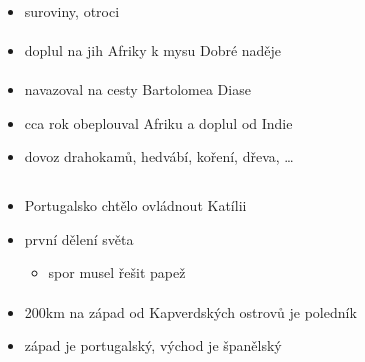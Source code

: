\paragraph{}
\begin{itemize}
\item suroviny, otroci
\end{itemize}

\paragraph{}
\begin{itemize}
\item doplul na jih Afriky k mysu Dobré naděje
\end{itemize}

\paragraph{}
\begin{itemize}
\item navazoval na cesty Bartolomea Diase
\item cca rok obeplouval Afriku a doplul od Indie
\item[\ra] dovoz drahokamů, hedvábí, koření, dřeva, \ldots
\end{itemize}

\paragraph{}


\subsection{}
\begin{itemize}
\item Portugalsko chtělo ovládnout Katílii
\item[\ra] první dělení světa
	\begin{itemize}
	\item spor musel řešit papež
	\end{itemize}
\end{itemize}

\paragraph{}
\begin{itemize}
\item 200km na západ od Kapverdských ostrovů je poledník
\item západ je portugalský, východ je španělský
\end{itemize}

